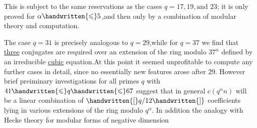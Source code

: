 This is subject to the same reservations as the cases $q=17,19,\text{and }23$; it is only proved for $\alpha\handwritten{\leqslant}5$,and then only by a combination of modular theory and computation.

The case $q=31$ is precisely analogous to $q=29$,while for $q=37$ we find that \uline{three} conjugates are required over an extension of the ring modulo $37^{\alpha}$ defined by an irreducible \uline{cubic}  equation.At this point it seemed unprofitable to compute any further cases in detail, since no essentially new features arose after $29$. However brief pre\reversemarginpar{}iminary investigations for all primes \uline{$q$} with $41\handwritten{\leqslant}q\handwritten{\leqslant}67$ suggest that in general $c(q^{\alpha}n)$ will be a linear combination of $\handwritten{[}q/12\handwritten{]}$  coefficients lying in various extensions of the ring modulo $q^{\alpha}$. In addition the analogy with Hecke theory for modular forms of negative dimension
